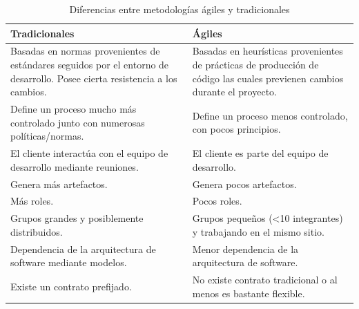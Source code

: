 \begin{table}[H]	
\begin{center}
\begin{tabular}{ | m{6cm} | m{6cm} | } 
 \hline
 Tradicionales & Ágiles \\ 
	\hline
	Basadas en normas provenientes de estándares seguidos por el entorno de desarrollo.  Posee cierta resistencia a los cambios. 
	&
	Basadas en heurísticas provenientes de prácticas de producción de código las cuales previenen cambios durante el proyecto.\\ 
 	\hline
 	Define un proceso mucho más controlado junto con numerosas políticas/normas.
	&
	Define un proceso menos controlado, con pocos principios.\\ 
	\hline
	El cliente interactúa con el equipo de desarrollo mediante reuniones.	
	&
	El cliente es parte del equipo de desarrollo. \\ 
	\hline
	Genera más artefactos.	
	&
	Genera pocos artefactos.\\ 
	\hline

	Más roles.	
	&
	Pocos roles.\\ 
	\hline

	Grupos grandes y posiblemente distribuidos.	
	&
	Grupos pequeños (<10 integrantes) y trabajando en el mismo sitio.\\ 
	\hline

	Dependencia de la arquitectura de software mediante modelos.	
	& 
	Menor dependencia de la arquitectura de software.\\ 
	\hline

	Existe un contrato prefijado.	
	&
	No existe contrato tradicional o al menos es bastante flexible.\\ 
	\hline

\end{tabular}
\caption{Diferencias entre metodologías ágiles y tradicionales}
\label{Tabla:3}
\end{center}
\end{table}	


